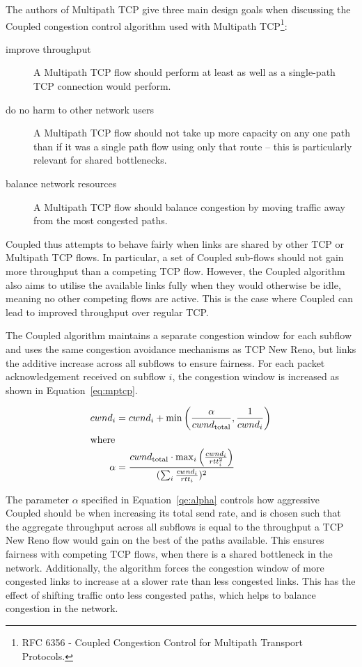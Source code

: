 
The authors of Multipath TCP give three main design goals when discussing the
Coupled congestion control algorithm used with Multipath TCP\footnote{RFC 6356 - Coupled Congestion Control for
Multipath Transport Protocols.}:

\begin{description}
  \item[improve throughput] A Multipath TCP flow should perform at least as well
    as a single-path TCP connection would perform.
  \item[do no harm to other network users] A Multipath TCP flow should not take
    up more capacity on any one path than if it was a single path flow using
    only that route -- this is particularly relevant for shared bottlenecks.
  \item[balance network resources] A Multipath TCP flow should balance congestion by moving
    traffic away from the most congested paths.
\end{description}

Coupled thus attempts to behave fairly when links are shared by other TCP or
Multipath TCP flows. In particular, a set of Coupled sub-flows should not gain
more throughput than a competing TCP flow. However, the Coupled algorithm also
aims to utilise the available
links fully when they would otherwise be idle, meaning no other competing flows
are active. This is the case where Coupled can lead to improved throughput over
regular TCP.

The Coupled algorithm maintains a separate congestion window for each subflow
and uses the same congestion avoidance mechanisms as TCP New Reno, but links the
additive increase across all subflows to ensure fairness. For each packet
acknowledgement received on subflow $i$, the congestion window is increased as
shown in Equation~\ref{eq:mptcp}.

\begin{align}
  cwnd_i &= cwnd_i +
    \min\left(\frac{\alpha}{cwnd_\text{total}}, \frac{1}{cwnd_i}\right)\label{eq:mptcp} \\
  \intertext{where}
  \alpha &=
    \frac{cwnd_\text{total} \cdot \max_i\left(\frac{cwnd_i}{rtt_i^2}\right)}
         {(\sum_i \frac{cwnd_i}{rtt_i})^2}\label{eq:alpha}
\end{align}

The parameter $\alpha$ specified in Equation~\ref{qe:alpha} controls how aggressive
Coupled should be when
increasing its total send rate, and is chosen such that the aggregate throughput
across all subflows is equal to the throughput a TCP New Reno flow would gain on
the best of the paths available. This ensures fairness with competing TCP flows,
when there is a shared bottleneck in the network.
Additionally, the algorithm forces the congestion window of more congested links
to increase at a slower rate than less congested links. This has the effect of
shifting traffic onto less congested paths, which helps to balance congestion in
the network.


